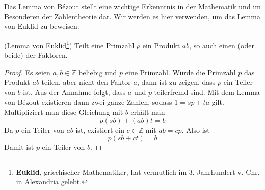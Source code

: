 Das Lemma von Bézout stellt eine wichtige Erkenntnis in der Mathematik und im Besonderen der Zahlentheorie dar. Wir werden es hier verwenden, um das Lemma von Euklid zu beweisen:

\begin{lemma}{(Lemma von Euklid\footnote{\textbf{Euklid}, griechischer Mathematiker, hat vermutlich im 3. Jahrhundert v. Chr. in Alexandria gelebt.})}
Teilt eine Primzahl $p$ ein Produkt $ab$, so auch einen (oder beide) der Faktoren.
\end{lemma}
\begin{proof}
Es seien $a,b \in \mathbb{Z}$ beliebig und $p$ eine Primzahl. Würde die Primzahl $p$ das Produkt $ab$ teilen, aber nicht den Faktor $a$, dann ist zu zeigen, dass $p$ ein Teiler von $b$ ist. Aus der Annahme folgt, dass $a$ und $p$ teilerfremd sind. Mit dem Lemma von Bézout existieren dann zwei ganze Zahlen, sodass $1=sp+ta$ gilt. Multipliziert man diese Gleichung mit $b$ erhält man
\[
p(sb)+(ab)t=b
\]
Da $p$ ein Teiler von $ab$ ist, existiert ein $c\in \mathbb{Z}$ mit $ab=cp$. Also ist
\[
p(sb+ct) = b
\]
Damit ist $p$ ein Teiler von $b$.
\end{proof}

